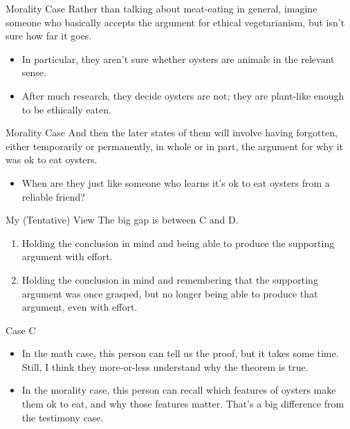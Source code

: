 \documentclass[
  17pt,
  letterpaper,
  ignorenonframetext,
  aspectratio=169,
]{beamer}
\providecommand{\tightlist}{%
  \setlength{\itemsep}{0pt}\setlength{\parskip}{0pt}}\usepackage{longtable,booktabs,array}
\begin{document}
\begin{frame}{Morality Case}
\protect\hypertarget{morality-case}{}
Rather than talking about meat-eating in general, imagine someone who
basically accepts the argument for ethical vegetarianism, but isn't sure
how far it goes.

\begin{itemize}[<+->]
\tightlist
\item
  In particular, they aren't sure whether oysters are animals in the
  relevant sense.
\item
  After much research, they decide oysters are not; they are plant-like
  enough to be ethically eaten.
\end{itemize}
\end{frame}

\begin{frame}{Morality Case}
\protect\hypertarget{morality-case-1}{}
And then the later states of them will involve having forgotten, either
temporarily or permanently, in whole or in part, the argument for why it
was ok to eat oysters.

\begin{itemize}[<+->]
\tightlist
\item
  When are they just like someone who learns it's ok to eat oysters from
  a reliable friend?
\end{itemize}
\end{frame}

\begin{frame}{My (Tentative) View}
\protect\hypertarget{my-tentative-view}{}
The big gap is between C and D.

\begin{enumerate}[<+->]
[A.]
\setcounter{enumi}{2}
\tightlist
\item
  Holding the conclusion in mind and being able to produce the
  supporting argument with effort.
\item
  Holding the conclusion in mind and remembering that the supporting
  argument was once grasped, but no longer being able to produce that
  argument, even with effort.
\end{enumerate}
\end{frame}

\begin{frame}{Case C}
\protect\hypertarget{case-c}{}
\begin{itemize}[<+->]
\tightlist
\item
  In the math case, this person can tell us the proof, but it takes some
  time. Still, I think they more-or-less understand why the theorem is
  true.
\item
  In the morality case, this person can recall which features of oysters
  make them ok to eat, and why those features matter. That's a big
  difference from the testimony case.
\end{itemize}
\end{frame}
\end{document}
